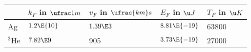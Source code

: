\begin{tabular}{@{}lllll@{}}
\toprule
          &    $k_F$ in $\ufrac 1m$ &         $v_F$ in $\ufrac {km}s$  &    $E_F$ in $\u J$&   $T_F$ in $\u K$ \\
\midrule
 Ag       & $1.2\E{10}$  &      $1.39\E3$ & $8.81\E{-19}$ &   63800 \\
 ${}^3$He & $7.82\E9$ & 905        & $3.73\E{-19}$ &   27000 \\
\bottomrule
\end{tabular}